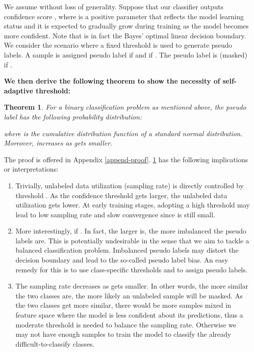 \documentclass{article} \usepackage{iclr2023_conference,times}
\theoremstyle{plain}
\newtheorem{theorem}{Theorem}[section]
\theoremstyle{definition}
\theoremstyle{remark}
\begin{document}
We assume  without loss of generality.
Suppose that our classifier outputs confidence score ,
where  is a positive parameter that reflects the model learning status and it is expected to gradually grow during training as the model becomes more confident. Note that  is in fact the Bayes' optimal linear decision boundary.  We consider the scenario where a fixed threshold  is used to generate pseudo labels. A sample  is assigned pseudo label  if  and  if . The pseudo label is  (masked) if .

\textbf{We then derive the following theorem to show the necessity of self-adaptive threshold:}


\begin{theorem}
\label{theorem1}
For a binary classification problem as mentioned above, the pseudo label  has the following probability distribution:

where  is the cumulative distribution function of a standard normal distribution. Moreover,  increases as  gets smaller.
\end{theorem} 





The proof is offered in Appendix \ref{append-proof}.
\cref{theorem1} has the following implications or interpretations:
\begin{enumerate}[label=(\roman*)]
\setlength\itemsep{0em}
    \item Trivially, unlabeled data utilization (sampling rate)  is directly controlled by threshold . As the confidence threshold  gets larger, the unlabeled data utilization gets lower. At early training stages, adopting a high threshold may lead to low sampling rate and slow convergence since  is still small.
    
    \item More interestingly,  if . In fact, the larger  is, the more imbalanced the pseudo labels are. This is potentially undesirable in the sense that we aim to tackle a balanced classification problem. Imbalanced pseudo labels may distort the decision boundary and lead to the so-called pseudo label bias. An easy remedy for this is to use class-specific thresholds  and  to assign pseudo labels.
   
    \item The sampling rate  decreases as  gets smaller. In other words, the more similar the two classes are, the more likely an unlabeled sample will be masked. As the two classes get more similar, there would be more samples mixed in feature space where the model is less confident about its predictions, thus a moderate threshold is needed to balance the sampling rate. Otherwise we may not have enough samples to train the model to classify the already difficult-to-classify classes.
\end{enumerate} 
\end{document}

